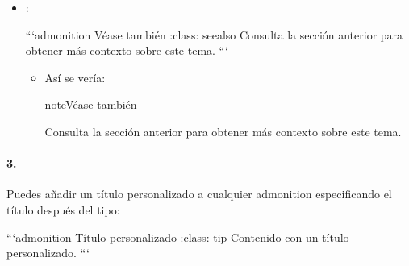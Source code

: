 \documentclass[a4paper,10pt,spanish]{sphinxmanual}
\begin{document}
\begin{itemize}
\begin{sphinxVerbatim}[commandchars=\\\{\}]
  ```\PYGZob{}admonition\PYGZcb{} Pista :class: hint Aquí hay una sugerencia útil para facilitar tu tarea. ```
\end{sphinxVerbatim}
\begin{itemize}
\item {} 
\sphinxAtStartPar
Así se vería:

\begin{sphinxadmonition}{note}{Pista}

\sphinxAtStartPar
Aquí hay una sugerencia útil para facilitar tu tarea.
\end{sphinxadmonition}

\end{itemize}

\item {} 
\sphinxAtStartPar
{}:

\begin{sphinxVerbatim}[commandchars=\\\{\}]
  ```\PYGZob{}admonition\PYGZcb{} Véase también :class: seealso  Consulta la sección anterior para obtener más contexto sobre este tema. ```
\end{sphinxVerbatim}
\begin{itemize}
\item {} 
\sphinxAtStartPar
Así se vería:

\begin{sphinxadmonition}{note}{Véase también}

\sphinxAtStartPar
Consulta la sección anterior para obtener más contexto sobre este tema.
\end{sphinxadmonition}

\end{itemize}

\end{itemize}


\paragraph{3. }
\label{\detokenize{configuracion_inicial/013.guia_de_myst_parser:admonitions-con-titulos-personalizados}}
\sphinxAtStartPar
Puedes añadir un título personalizado a cualquier admonition especificando el título después del tipo:

\begin{sphinxVerbatim}[commandchars=\\\{\}]
  ```\PYGZob{}admonition\PYGZcb{} Título personalizado :class: tip Contenido con un título personalizado. ```
\end{sphinxVerbatim}
\end{document}
